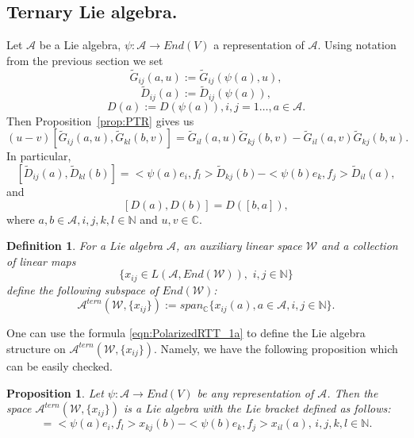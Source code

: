 \documentclass[10pt]{article}%
\numberwithin{equation}{section}
\newtheorem{prop}[thm]{Proposition}
\newtheorem{defin}[thm]{Definition}
\begin{document}
\subsection{Ternary Lie algebra.}

Let $\mathcal{A}$ be a Lie algebra,
 $\psi:\mathcal{A}\to End(V)$  a   representation of $\mathcal{A}$.  Using notation from the previous section we set
\begin{equation}
\widetilde{G}_{ij}(a,u):=\widetilde{G}_{ij}(\psi(a),u),
\end{equation}
\begin{equation}
\widetilde{D}_{ij}(a):=\widetilde{D}_{ij}(\psi(a)),\label{eqn:Tilde_D}
\end{equation}
\begin{equation}
D(a):=D(\psi(a)),i,j=1\ldots,a\in \mathcal{A}.
\end{equation}
Then Proposition~\ref{prop:PTR} gives us 
\begin{equation}\label{eqn:PolarizedRTTa}
(u-v)[\widetilde{G}_{ij}(a,u),\widetilde{G}_{kl}(b,v)]=\widetilde{G}_{il}(a,u)\widetilde{G}_{kj}(b,v)-\widetilde{G}_{il}(a,v)\widetilde{G}_{kj}(b,u).
\end{equation}
In particular,
\begin{equation}\label{eqn:PolarizedRTT_1a}
[\widetilde{D}_{ij}(a),\widetilde{D}_{kl}(b)]=<\psi(a)e_{i},f_l>\widetilde{D}_{kj}(b)-<\psi(b)e_{k},f_j>\widetilde{D}_{il}(a),
\end{equation}
and
\begin{equation}\label{eqn:PolarizedRTT_2a}
[D(a),D(b)]=D([b,a]),
\end{equation}
where
 $a,b\in\mathcal{A},i,j,k,l\in\mathbb{N}$ and $u,v\in\mathbb{C}$.


 
\begin{defin}\label{def:TernaryAlg}
For a Lie algebra $\mathcal{A}$, an auxiliary linear space $\mathcal{W}$ and a collection of linear maps 
$$\{x_{ij}\in L(\mathcal{A}, End(\mathcal{W})), \,\, i,j\in\mathbb{N}\}$$
define the following subspace of $End(\mathcal{W})$:
\begin{equation}
\mathcal{A}^{tern}(\mathcal{W}, \{x_{ij}\}):=span_{\mathbb C}\{x_{ij}(a), a\in \mathcal{A}, i,j\in\mathbb{N}\}.
\end{equation}
\end{defin}

One can use the formula \eqref{eqn:PolarizedRTT_1a} 
to define the Lie algebra structure on $\mathcal{A}^{tern}(\mathcal{W}, \{x_{ij}\})$. Namely, we have the following proposition which can be easily checked.
\begin{prop} Let $\psi:\mathcal{A}\to End(V)$ be any representation of $\mathcal{A}$.
Then the space $\mathcal{A}^{tern}(\mathcal{W}, \{x_{ij}\})$ is a Lie algebra with the Lie bracket defined as follows:
\begin{equation*}
[x_{ij}(a),x_{kl}(b)]=<\psi(a)e_{i},f_l>x_{kj}(b)-<\psi(b)e_{k},f_j>x_{il}(a),\, i,j,k,l\in\mathbb{N}.
\end{equation*}
\end{prop}
\end{document}
